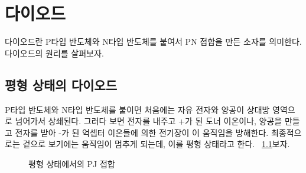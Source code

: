 \chapter{다이오드}
다이오드란 P타입 반도체와 N타입 반도체를 붙여서 PN 접합을 만든 소자를 의미한다. 다이오드의 원리를 살펴보자.
\section{평형 상태의 다이오드}
P타입 반도체와 N타입 반도체를 붙이면 처음에는 자유 전자와 양공이 상대방 영역으로 넘어가서 상쇄된다. 그러다 보면 전자를 내주고 +가 된 도너 이온이나, 양공을 만들고 전자를 받아 -가 된 억셉터 이온들에 의한 전기장이 이 움직임을 방해한다.
최종적으로는 겉으로 보기에는 움직임이 멈추게 되는데, 이를 평형 상태라고 한다. \figurename~\ref{fig:eq pn junc}\을 보자.
\begin{figure}
   \centering
   \caption{평형 상태에서의 PJ 접합}\label{fig:eq pn junc}
\end{figure}

